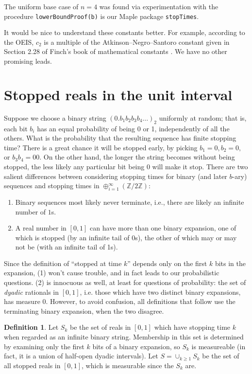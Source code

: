 \documentclass[12pt]{article}
\newcommand{\Z}{\mathbb{Z}}
\theoremstyle{definition}
\newtheorem{definition}{Definition}
\begin{document}
The uniform base case of $n = 4$ was found via experimentation with
the procedure \texttt{lowerBoundProof(b)} is our Maple package
\texttt{stopTimes}.

It would be nice to understand these constants better. For example, according
to the OEIS, $c_2$ is a multiple of the Atkinson--Negro--Santoro constant given
in Section 2.28 of Finch's book of mathematical constants
\cite{finch2003mathematical}. We have no other promising leads.

\section{Stopped reals in the unit interval}
\label{sec:reals}

Suppose we choose a binary string $(0.b_1 b_2 b_3 b_4 ...)_2$ uniformly at
random; that is, each bit $b_i$ has an equal probability of being 0 or 1,
independently of all the others.  What is the probability that the resulting
sequence has finite stopping time? There is a great chance it will be stopped
early, by picking $b_1=0, b_2=0,$ or $b_3 b_4 = 00.$ On the other hand, the
longer the string becomes without being stopped, the less likely any particular
bit being $0$ will make it stop. There are two salient differences between
considering stopping times for binary (and later $b$-ary) sequences and
stopping times in $\oplus_{i=1}^\infty (\Z/2\Z)$:
\begin{enumerate}
    \item Binary sequences most likely never terminate, i.e., there are likely
        an infinite number of $1$s.
    \item A real number in $[0,1]$ can have more than one binary expansion,
        one of which is stopped (by an infinite tail of 0s), the other of which
        may or may not be (with an infinite tail of 1s).
\end{enumerate}
Since the definition of ``stopped at time $k$'' depends only on the first $k$ bits in the expansion,
(1) won't cause trouble, and in fact leads to our probabilistic questions.
(2) is innocuous as well, at least for questions of probability: the set of \emph{dyadic} rationals
in $[0,1]$, i.e. those which have two distinct binary expansions, has measure 0.
However, to avoid confusion, all definitions that follow use the terminating binary expansion, when the two disagree.

\begin{definition}
    Let $S_k$ be the set of reals in $[0, 1]$ which have stopping time $k$ when
    regarded as an infinite binary string. Membership in this set is determined
    by examining only the first $k$ bits of a binary expansion, so $S_k$ is
    measureable (in fact, it is a union of half-open dyadic intervals). Let $S = \cup_{k \geq 1} S_k$ be the set of all stopped reals
    in $[0, 1]$, which is measurable since the $S_k$ are.
\end{definition}
\end{document}
